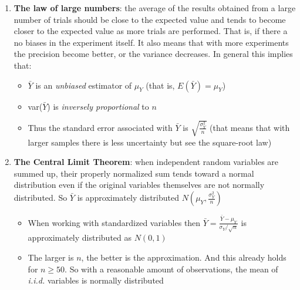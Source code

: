 \documentclass[
]{book}
\providecommand{\tightlist}{%
  \setlength{\itemsep}{0pt}\setlength{\parskip}{0pt}}
\begin{document}
\begin{enumerate}
\def\labelenumi{\arabic{enumi}.}
\tightlist
\item
  \textbf{The law of large numbers}: the average of the results obtained from a large number of trials should be close to the expected value and tends to become closer to the expected value as more trials are performed. That is, if there a no biases in the experiment itself. It also means that with more experiments the precision become better, or the variance decreases. In general this implies that:

  \begin{itemize}
  \tightlist
  \item
    \(\bar{Y}\) is an \emph{unbiased} estimator of \(\mu_Y\) (that is, \(E(\bar{Y}) = \mu_Y\))
  \item
    var(\(\bar{Y}\)) is \emph{inversely proportional} to \(n\)
  \item
    Thus the standard error associated with \(\bar{Y}\) is \(\sqrt{\frac{\sigma_Y^2}{n}}\) (that means that with larger samples there is less uncertainty but see the square-root law)
  \end{itemize}
\item
  \textbf{The Central Limit Theorem}: when independent random variables are summed up, their properly normalized sum tends toward a normal distribution even if the original variables themselves are not normally distributed. So \(\bar{Y}\) is approximately distributed \(N(\mu_Y,\frac{\sigma^2_Y}{n})\)

  \begin{itemize}
  \tightlist
  \item
    When working with standardized variables then \(\bar{Y} = \frac{\bar{Y}-\mu_Y}{\sigma_Y/\sqrt{n}}\) is approximately distributed as \(N(0,1)\) \newline
  \item
    The larger is \(n\), the better is the approximation. And this already holds for \(n \geq 50\). So with a reasonable amount of observations, the mean of \emph{i.i.d.} variables is normally distributed
  \end{itemize}
\end{enumerate}
\end{document}
